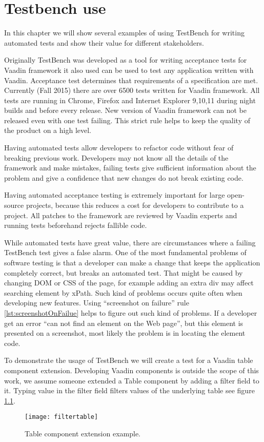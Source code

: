 \chapter{Testbench use}
\label{ch:testbenchuse}
In this chapter we will show several examples of using TestBench for writing
automated tests and show their value for different stakeholders. 

Originally TestBench was developed as a tool for writing acceptance tests for 
Vaadin framework it also used can be used to test any application written with
Vaadin. Acceptance test determines that requirements of a specification are met.
Currently (Fall 2015) there are over 6500 tests written for Vaadin framework.
All tests are running in Chrome, Firefox and Internet Explorer 9,10,11 during
night builds and before every release. New version of Vaadin framework can
not be released even with one test failing. This strict rule helps to keep
the quality of the product on a high level.

Having automated tests allow developers to refactor code without fear of
breaking previous work. Developers may not know all the details of the framework and make mistakes,
 failing tests give sufficient information about the problem 
 and give a confidence that new changes do not break existing code.
   
 Having automated acceptance testing is extremely important for large
 open-source projects, because this reduces a cost for developers to contribute
 to a project.  All patches to the framework are reviewed by Vaadin experts and
 running tests beforehand rejects fallible code.

 While automated tests have great value, there are circumstances
 where a failing TestBench test gives a false alarm. One of the most fundamental
  problems of software testing is that a developer can make a change that keeps
   the application completely correct, but breaks an automated test.   
That might be caused by changing DOM or CSS of the page, for example adding
an extra div may affect searching element by xPath. Such kind of problems 
occurs quite often when developing new features. Using ``screenshot on failure''
rule \ref{lst:screenshotOnFailue} helps to figure out such kind of problems. If
a developer get an error ``can not find an element on the Web page'', 
but this element is presented on a screenshot, most likely the problem is in
locating the element code.

To demonstrate the usage of TestBench we will create a test for a Vaadin table
component extension. Developing Vaadin components is outside the scope of
this work, we assume someone extended a Table component by adding a filter field to
it. Typing value in the filter field filters values of the underlying table see
figure \ref{fig:filtertable}.
	\begin{figure}
	\centering
	\texttt{[image: filtertable]}
	\caption{Table component extension example.}
	\label{fig:filtertable}
	\end{figure}

